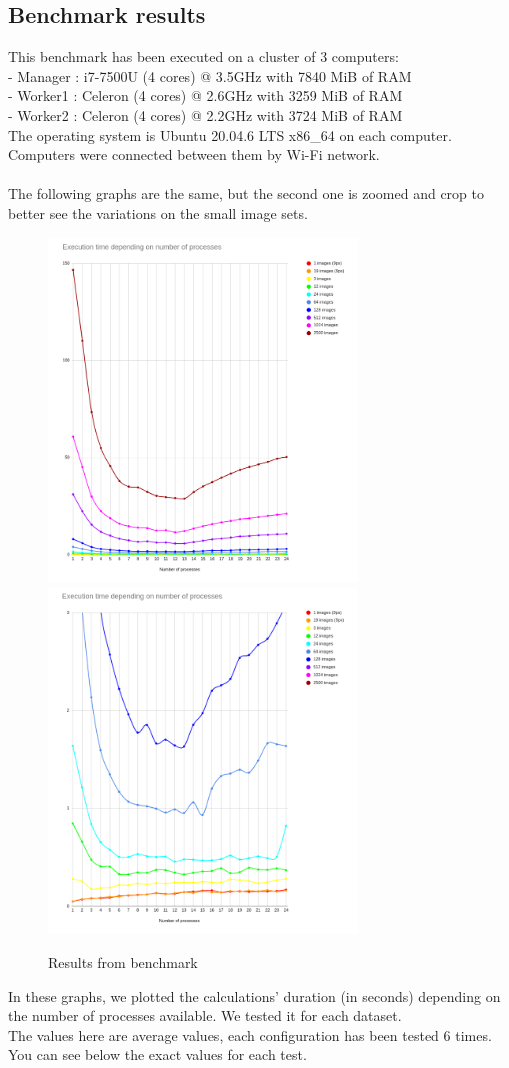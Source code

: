 \subsection{Benchmark results}
This benchmark has been executed on a cluster of 3 computers:\\
 - Manager : i7-7500U (4 cores) @ 3.5GHz with 7840 MiB of RAM\\
 - Worker1 : Celeron (4 cores) @ 2.6GHz with 3259 MiB of RAM\\
 - Worker2 : Celeron (4 cores) @ 2.2GHz with 3724 MiB of RAM\\
The operating system is Ubuntu 20.04.6 LTS x86\_64 on each computer. Computers were connected between them by Wi-Fi network.\\
\\
The following graphs are the same, but the second one is zoomed and crop to better see the variations on the small image sets.
\begin{figure}[H]
    \centering
    \includegraphics[width=8.2cm]{images/perfsAverage.png}
    \includegraphics[width=8.2cm]{images/perfsAverageZoomed.png}
    \caption{Results from benchmark}
    \label{fig:benchmarkResAverage}
\end{figure}
In these graphs, we plotted the calculations' duration (in seconds) depending on the number of processes available. We tested it for each dataset.\\
The values here are average values, each configuration has been tested 6 times.\\
You can see below the exact values for each test.

